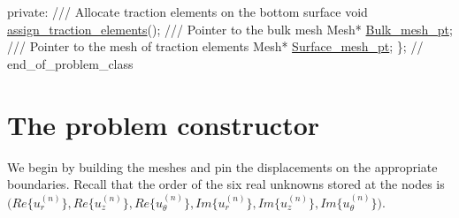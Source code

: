\begin{DoxyCodeInclude}
\textcolor{keyword}{private}:
 \textcolor{comment}{}
\textcolor{comment}{ /// Allocate traction elements on the bottom surface}
\textcolor{comment}{} \textcolor{keywordtype}{void} \hyperlink{classFourierDecomposedTimeHarmonicLinearElasticityProblem_ab995077cbd92377b726d0ea0de81720e}{assign\_traction\_elements}();
 \textcolor{comment}{}
\textcolor{comment}{ /// Pointer to the bulk mesh}
\textcolor{comment}{} Mesh* \hyperlink{classFourierDecomposedTimeHarmonicLinearElasticityProblem_abc7e142ef488a0533a2544ac302f8b08}{Bulk\_mesh\_pt};
 \textcolor{comment}{}
\textcolor{comment}{ /// Pointer to the mesh of traction elements}
\textcolor{comment}{} Mesh* \hyperlink{classFourierDecomposedTimeHarmonicLinearElasticityProblem_aaf7a1b8aadd027cf6ed340e31fb53550}{Surface\_mesh\_pt};
\}; \textcolor{comment}{// end\_of\_problem\_class}

\end{DoxyCodeInclude}




 

\hypertarget{index_constructor}{}\section{The problem constructor}\label{index_constructor}
We begin by building the meshes and pin the displacements on the appropriate boundaries. Recall that the order of the six real unknowns stored at the nodes is $ \big(Re\{u_r^{(n)}\}, Re\{u_z^{(n)}\}, Re\{u_\theta^{(n)}\}, Im\{u_r^{(n)}\}, Im\{u_z^{(n)}\}, Im\{u_\theta^{(n)}\}\big). $


